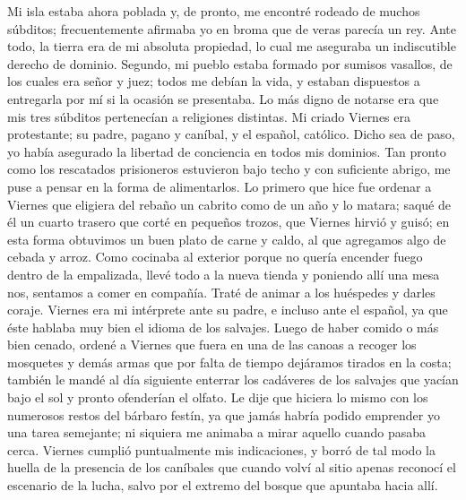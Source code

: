 \documentclass{novela}
\begin{document}
    Mi isla estaba ahora poblada y, de pronto, me encontré rodeado de muchos súbditos; frecuentemente afirmaba yo en broma que de veras parecía un rey. Ante todo, la tierra era de mi absoluta propiedad, lo cual me aseguraba un indiscutible derecho de dominio. Segundo, mi pueblo estaba formado por sumisos vasallos, de los cuales era señor y juez; todos me debían la vida, y estaban dispuestos a entregarla por mí si la ocasión se presentaba. Lo más digno de notarse era que mis tres súbditos pertenecían a religiones distintas. Mi criado Viernes era protestante; su padre, pagano y caníbal, y el español, católico. Dicho sea de paso, yo había asegurado la libertad de conciencia en todos mis dominios.
    Tan pronto como los rescatados prisioneros estuvieron bajo techo y con suficiente abrigo, me puse a pensar en la forma de alimentarlos. Lo primero que hice fue ordenar a Viernes que eligiera del rebaño un cabrito como de un año y lo matara; saqué de él un cuarto trasero que corté en pequeños trozos, que Viernes hirvió y guisó; en esta forma obtuvimos un buen plato de carne y caldo, al que agregamos algo de cebada y arroz. Como cocinaba al exterior porque no quería encender fuego dentro de la empalizada, llevé todo a la nueva tienda y poniendo allí una mesa nos, sentamos a comer en compañía. Traté de animar a los huéspedes y darles coraje. Viernes era mi intérprete ante su padre, e incluso ante el español, ya que éste hablaba muy bien el idioma de los salvajes.
    Luego de haber comido o más bien cenado, ordené a Viernes que fuera en una de las canoas a recoger los mosquetes y demás armas que por falta de tiempo dejáramos tirados en la costa; también le mandé al día siguiente enterrar los cadáveres de los salvajes que yacían bajo el sol y pronto ofenderían el olfato. Le dije que hiciera lo mismo con los numerosos restos del bárbaro festín, ya que jamás habría podido emprender yo una tarea semejante; ni siquiera me animaba a mirar aquello cuando pasaba cerca. Viernes cumplió puntualmente mis indicaciones, y borró de tal modo la huella de la presencia de los caníbales que cuando volví al sitio apenas reconocí el escenario de la lucha, salvo por el extremo del bosque que apuntaba hacia allí.
\end{document}
